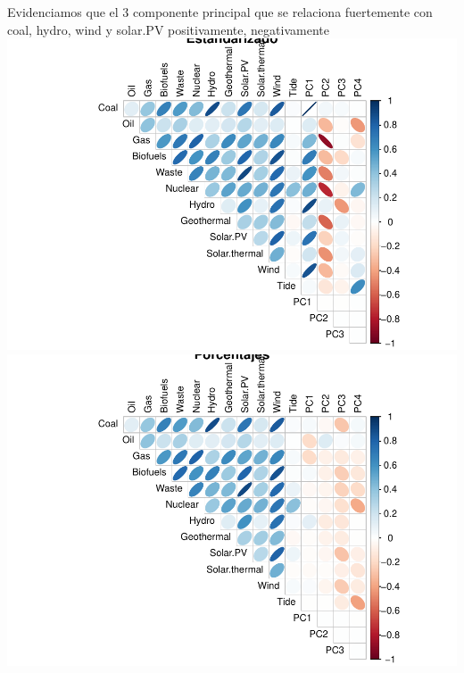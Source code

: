 \documentclass[
]{article}
\begin{document}
Evidenciamos que el 3 componente principal que se relaciona fuertemente
con coal, hydro, wind y solar.PV positivamente, negativamente
\includegraphics{AMTV_Docum_Consolidado_files/figure-latex/unnamed-chunk-20-1.pdf}
\includegraphics{AMTV_Docum_Consolidado_files/figure-latex/unnamed-chunk-20-2.pdf}
\end{document}
